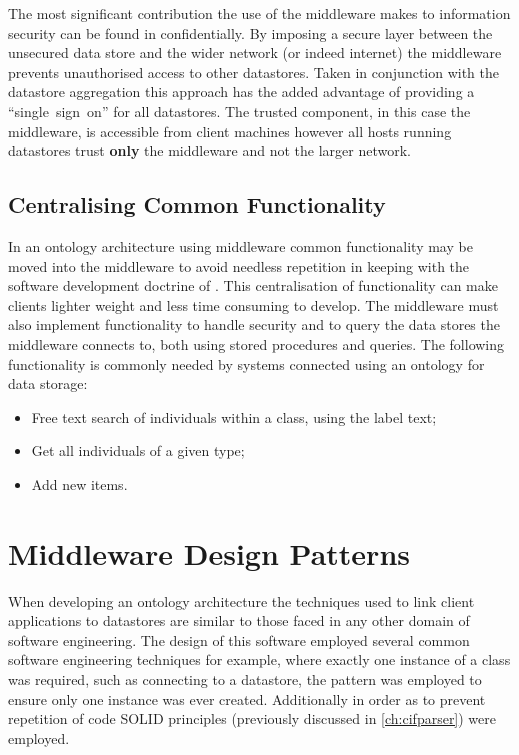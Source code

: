 The most significant contribution the use of the middleware makes to information security can be found in confidentially. By imposing a secure layer between the unsecured data store and the wider network (or indeed internet) the middleware prevents unauthorised access to other datastores. Taken in conjunction with the datastore aggregation this approach has the added advantage of providing a ``single~sign~on'' for all datastores. The trusted component, in this case the middleware, is accessible from client machines however all hosts running datastores trust \textbf{only} the middleware and not the larger network. 

\subsection{Centralising Common Functionality}\label{midfunc}
In an ontology architecture using middleware common functionality may be moved into the middleware to avoid needless repetition in keeping with the software development doctrine of . This centralisation of functionality can make clients lighter weight and less time consuming to develop. The middleware must also implement functionality to handle security and to query the data stores the middleware connects to, both using stored procedures and queries. The following functionality is commonly needed by systems connected using an ontology for data storage:
\begin{itemize}
    \item Free text search of individuals within a class, using the label text;
    \item Get all individuals of a given type;
    \item Add new items.    
\end{itemize}


\section{Middleware Design Patterns}
When developing an ontology architecture the techniques used to link client applications to datastores are similar to those faced in any other domain of software engineering. 
The design of this software employed several common software engineering techniques for example, where exactly one instance of a class was required, such as connecting to a datastore, the  pattern was employed to ensure only one instance was ever created. Additionally in order as to prevent repetition of code SOLID principles (previously discussed in \autoref{ch:cifparser}) were employed.

